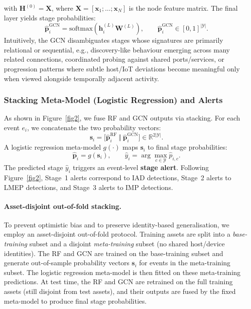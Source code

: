 \documentclass[pdflatex,sn-mathphys-num]{sn-jnl}
\theoremstyle{thmstyleone}%
\theoremstyle{thmstyletwo}%
\theoremstyle{thmstylethree}%
\begin{document}
with $\mathbf{H}^{(0)}=\mathbf{X}$, where $\mathbf{X}=[\mathbf{x}_1;\ldots;\mathbf{x}_N]$ is the node feature matrix. The final layer yields stage probabilities:
\begin{equation}
\hat{\mathbf{p}}^{\text{GCN}}_i=\text{softmax}\!\left(\mathbf{h}^{(L)}_i\mathbf{W}^{(L)}\right),
\qquad
\hat{\mathbf{p}}^{\text{GCN}}_i \in [0,1]^{|\mathcal{Y}|}.
\end{equation}
Intuitively, the GCN disambiguates stages whose signatures are primarily relational or sequential, e.g., discovery-like behaviour emerging across many related connections, coordinated probing against shared ports/services, or progression patterns where subtle host/IoT deviations become meaningful only when viewed alongside temporally adjacent activity.

\subsubsection{Stacking Meta-Model (Logistic Regression) and Alerts}
\label{sec:framework_stacking}
As shown in Figure~\ref{fig2}, we fuse RF and GCN outputs via stacking. For each event $e_i$, we concatenate the two probability vectors:
\begin{equation}
\mathbf{s}_i=\big[\hat{\mathbf{p}}^{\text{RF}}_i \ \Vert\  \hat{\mathbf{p}}^{\text{GCN}}_i\big]\in\mathbb{R}^{2|\mathcal{Y}|}.
\end{equation}
A logistic regression meta-model $g(\cdot)$ maps $\mathbf{s}_i$ to final stage probabilities:
\begin{equation}
\hat{\mathbf{p}}_i = g(\mathbf{s}_i),
\qquad 
\hat{y}_i=\arg\max_{c\in\mathcal{Y}}\hat{p}_{i,c}.
\end{equation}
The predicted stage $\hat{y}_i$ triggers an event-level \textbf{stage alert}. Following Figure~\ref{fig2}, Stage~1 alerts correspond to IAD detections, Stage~2 alerts to LMEP detections, and Stage~3 alerts to IMP detections.


\paragraph{Asset-disjoint out-of-fold stacking.}
To prevent optimistic bias and to preserve identity-based generalisation, we employ an asset-disjoint out-of-fold protocol. Training assets are split into a \emph{base-training} subset and a disjoint \emph{meta-training} subset (no shared host/device identities). The RF and GCN are trained on the base-training subset and generate out-of-sample probability vectors $\mathbf{s}_i$ for events in the meta-training subset. The logistic regression meta-model is then fitted on these meta-training predictions. At test time, the RF and GCN are retrained on the full training assets (still disjoint from test assets), and their outputs are fused by the fixed meta-model to produce final stage probabilities.
\end{document}
